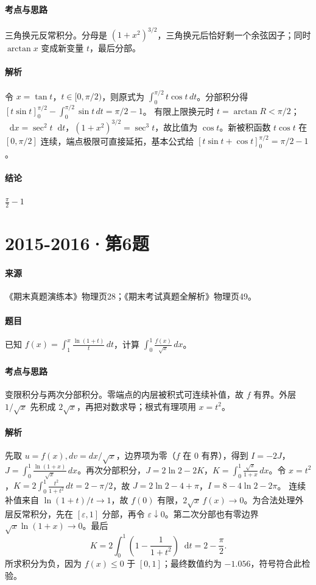 \documentclass[UTF8,fontset=fandol,12pt,oneside,openany]{ctexrep}
\newcommand{\dd}{\mathop{}\!\mathrm d}
\theoremstyle{definition}
\begin{document}
\paragraph{考点与思路}
三角换元反常积分。分母是 $(1+x^2)^{3/2}$，三角换元后恰好剩一个余弦因子；同时 $\arctan x$ 变成新变量 $t$，最后分部。
\paragraph{解析}
令 $x=\tan t$，$t\in[0,\pi/2)$，则原式为 $\int_0^{\pi/2}t\cos t\,dt$。分部积分得 $[t\sin t]_0^{\pi/2}-\int_0^{\pi/2}\sin t\,dt=\pi/2-1$。
有限上限换元时 $t=\arctan R<\pi/2$；$\dd x=\sec^2t\dd t$，$(1+x^2)^{3/2}=\sec^3t$，故比值为 $\cos t$。新被积函数 $t\cos t$ 在 $[0,\pi/2]$ 连续，端点极限可直接延拓，基本公式给 $[t\sin t+\cos t]_0^{\pi/2}=\pi/2-1$。
\paragraph{结论}
$\frac\pi2-1$

\par\addvspace{18pt}\noindent\begin{minipage}{\linewidth}
\section{2015-2016·第6题}
\label{exam:11:q33}
\paragraph{来源} 《期末真题演练本》物理页28；《期末考试真题全解析》物理页49。
\paragraph{题目}
已知 $f(x)=\int_1^x\frac{\ln(1+t)}t\,dt$，计算 $\int_0^1\frac{f(x)}{\sqrt x}\,dx$。
\end{minipage}\par
\paragraph{考点与思路}
变限积分与两次分部积分。零端点的内层被积式可连续补值，故 $f$ 有界。外层 $1/\sqrt x$ 先积成 $2\sqrt x$，再把对数求导；根式有理项用 $x=t^2$。
\paragraph{解析}
先取 $u=f(x),dv=dx/\sqrt x$，边界项为零（$f$ 在 $0$ 有界），得到 $I=-2J$，$J=\int_0^1\frac{\ln(1+x)}{\sqrt x}\,dx$。再次分部积分，$J=2\ln2-2K$，$K=\int_0^1\frac{\sqrt x}{1+x}\,dx$。令 $x=t^2$，$K=2\int_0^1\frac{t^2}{1+t^2}\,dt=2-\pi/2$，故 $J=2\ln2-4+\pi$，$I=8-4\ln2-2\pi$。
连续补值来自 $\ln(1+t)/t\to1$，故 $f(0)$ 有限，$2\sqrt x\,f(x)\to0$。为合法处理外层反常积分，先在 $[\varepsilon,1]$ 分部，再令 $\varepsilon\downarrow0$。第二次分部也有零边界 $\sqrt x\ln(1+x)\to0$。最后
\[
K=2\int_0^1\left(1-\frac1{1+t^2}\right)\dd t=2-\frac\pi2.
\]
所求积分为负，因为 $f(x)\le0$ 于 $[0,1]$；最终数值约为 $-1.056$，符号符合此检验。
\end{document}

